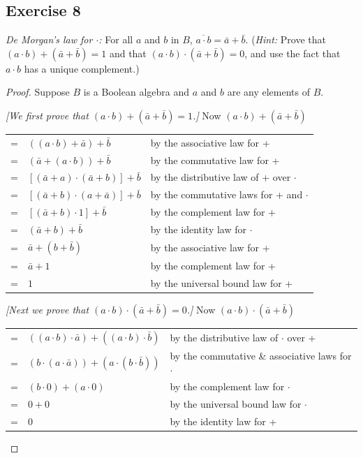 \documentclass[14pt]{extarticle}
\newcommand{\cy}{\color{cyan}}
\begin{document}
\subsection{Exercise 8}
{\it De Morgan’s law for $\cdot$:} For all $a$ and $b$ in $B$, \(\overline{a \cdot b} = \bar{a} + \bar{b}\). 
({\it Hint:} Prove that \((a \cdot b) + (\bar{a} + \bar{b}) 
= 1\) and that \((a \cdot b) \cdot (\bar{a} + \bar{b}) = 0\), and use the fact that \(a \cdot b\) has a unique complement.)

\begin{proof}
Suppose $B$ is a Boolean algebra and $a$ and $b$ are any elements of $B$. 

{\it [We first prove that \((a \cdot b) + (\bar{a} + \bar{b}) = 1\).]} Now \((a \cdot b) + (\bar{a} + \bar{b})\)

\begin{center}
\begin{tabular}{cll}
= & \(((a \cdot b) + \bar{a}) + \bar{b}\) & {\cy by the associative law for +} \\
= & \((\bar{a} + (a \cdot b)) + \bar{b}\) & {\cy by the commutative law for +} \\
= & \([(\bar{a} + a) \cdot (\bar{a} + b)] + \bar{b}\) & {\cy by the distributive law of + over $\cdot$} \\
= & \([(\bar{a} + b) \cdot (a + \bar{a})] + \bar{b}\) & {\cy by the commutative laws for + and $\cdot$} \\
= & \([(\bar{a} + b) \cdot 1] + \bar{b}\) & {\cy by the complement law for +} \\
= & \((\bar{a} + b) + \bar{b}\) & {\cy by the identity law for $\cdot$} \\
= & \(\bar{a} + (b + \bar{b})\) & {\cy by the associative law for +} \\
= & \(\bar{a} + 1\) & {\cy by the complement law for +} \\
= & \(1\) & {\cy by the universal bound law for +}
\end{tabular}
\end{center}

{\it [Next we prove that \((a \cdot b) \cdot (\bar{a} + \bar{b}) = 0\).]} Now \((a \cdot b) \cdot (\bar{a} + \bar{b})\)

\begin{center}
\begin{tabular}{cll}
= & \(((a \cdot b) \cdot \bar{a}) + ((a \cdot b) \cdot \bar{b})\) & {\cy by the distributive law of $\cdot$ over +} \\
= & \((b \cdot (a \cdot \bar{a})) + (a \cdot (b \cdot \bar{b}))\) & {\cy by the commutative \& associative laws for $\cdot$} \\
= & \((b \cdot 0) + (a \cdot 0)\) & {\cy by the complement law for $\cdot$} \\
= & \(0 + 0\) & {\cy by the universal bound law for $\cdot$} \\
= & \(0\) & {\cy by the identity law for +}
\end{tabular}
\end{center}


\end{proof}
\end{document}
